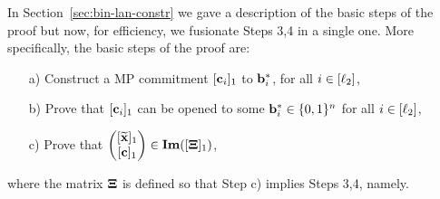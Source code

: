 In Section~\ref{sec:bin-lan-constr} we gave a description of the basic steps of the proof
but now, for efficiency, we fusionate Steps 3,4 in a single one. More specifically, the basic steps of the proof are:
\begin{enumerate}
\item[a)] Construct a MP commitment $[\mathbf{c}_i]_1$ to $\mathbf{b}^*_i$, for all $i \in [{\ell_2}]$,
\item[b)] Prove that  $[\mathbf{c}_i]_1$  can be opened to some $\mathbf{b}^*_i \in \{0,1\}^{n}$ for all $i \in [{\ell_2}]$, 
\item[c)] Prove that $\begin{pmatrix}[\widetilde{\vecb{x}}]_1 \\ [\vecb{c}]_1 \end{pmatrix} \in \mathbf{Im}([\matr{\Xi}]_1)$, 
\end{enumerate}
where the matrix $\mathbf{{\Xi}}$ is defined so that Step c) implies Steps 3,4, namely.

